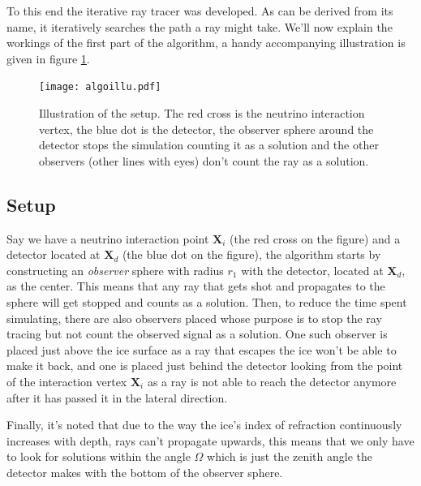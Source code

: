 To this end the iterative ray tracer \cite{2022icrc.confE1027O} was developed.
As can be derived from its name, it iteratively searches the path a ray might
take. We'll now explain the workings of the first part of the algorithm, a handy
accompanying illustration is given in figure \ref{fig:Illustration of iterative algorithm}.
\begin{figure}
  \centering
  \texttt{[image: algoillu.pdf]}
  \caption{Illustration of the setup. The red cross is the neutrino interaction vertex, the blue dot is the detector,
  the observer sphere around the detector stops the simulation counting it as a solution and the other observers (other lines with eyes) don't count the ray as a solution.}
  \label{fig:Illustration of iterative algorithm}
\end{figure}
\subsection{Setup}
Say we have a neutrino interaction point $\mathbf{X}_i$
(the red cross on the figure) and a detector located at $\mathbf{X}_d$ (the
blue dot on the figure), the algorithm starts by constructing an
\textit{observer} sphere with radius $r_1$ with the detector, located at $\mathbf{X}_d$, as the
center.  This means that any ray that gets shot and propagates to the sphere
will get stopped and counts as a solution.  Then, to reduce the time spent simulating, there are also observers placed
whose purpose is to stop the ray tracing but not count the observed signal as a solution.
One such observer is placed 
just above the ice surface as a ray that escapes the ice won't be able to make it back, and one
is placed just behind the detector looking from the point of the interaction vertex $\mathbf{X}_i$ as
a ray is not able to reach the detector anymore after it has passed it in the
lateral direction. 

Finally, it's noted that due to the way the ice's index of refraction
continuously increases with depth, rays can't propagate upwards, this means that we only 
have to look for solutions within the angle $\Omega$ which is just the zenith angle the detector
makes with the bottom of the observer sphere.

